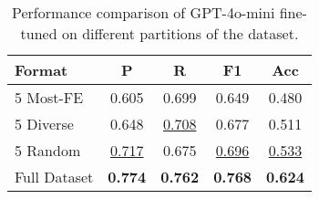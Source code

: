 \begin{table}
    \centering
    \begin{tabularx}{\linewidth}{Xcccc}
        \hline
        \textbf{Format} & \textbf{P} & \textbf{R} & \textbf{F1} & \textbf{Acc} \\ 
        \hline
        5 Most-FE & 0.605 & 0.699 & 0.649 & 0.480 \\ 
        5 Diverse & 0.648 & \underline{0.708} & 0.677 & 0.511 \\ 
        5 Random & \underline{0.717} & 0.675 & \underline{0.696} & \underline{0.533} \\ 
        \hline
        Full Dataset & \textbf{0.774} & \textbf{0.762} & \textbf{0.768} & \textbf{0.624} \\ 
        \hline
    \end{tabularx}
    \caption{Performance comparison of GPT-4o-mini fine-tuned on different partitions of the dataset.}
    \label{tab:finetune-data-subsample}
\end{table}


